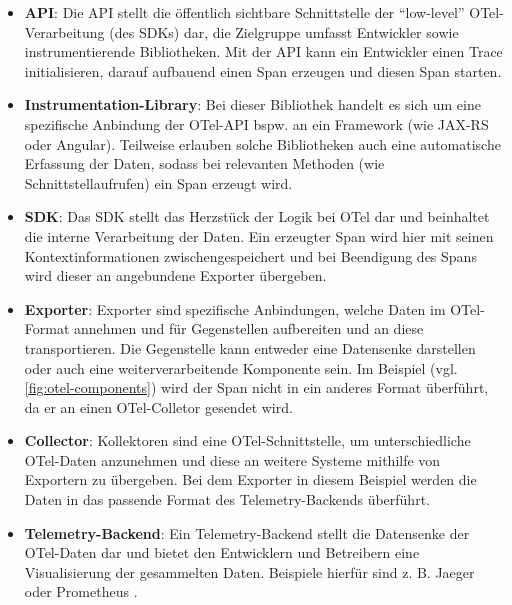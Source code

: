 \begin{itemize}
	\item \textbf{API}: Die API stellt die öffentlich sichtbare Schnittstelle der \enquote{low-level} OTel-Verarbeitung (des SDKs) dar, die Zielgruppe umfasst Entwickler sowie instrumentierende Bibliotheken. Mit der API kann ein Entwickler einen Trace initialisieren, darauf aufbauend einen Span erzeugen und diesen Span starten.
	
	\item \textbf{Instrumentation-Library}: Bei dieser Bibliothek handelt es sich um eine spezifische Anbindung der OTel-API bspw. an ein Framework (wie JAX-RS oder Angular). Teilweise erlauben solche Bibliotheken auch eine automatische Erfassung der Daten, sodass bei relevanten Methoden (wie Schnittstellaufrufen) ein Span erzeugt wird.
	
	\item \textbf{SDK}: Das SDK stellt das Herzstück der Logik bei OTel dar und beinhaltet die interne Verarbeitung der Daten. Ein erzeugter Span wird hier mit seinen Kontextinformationen zwischengespeichert und bei Beendigung des Spans wird dieser an angebundene Exporter übergeben.
	
	\item \textbf{Exporter}: Exporter sind spezifische Anbindungen, welche Daten im OTel-Format annehmen und für Gegenstellen aufbereiten und an diese transportieren. Die Gegenstelle kann entweder eine Datensenke darstellen oder auch eine weiterverarbeitende Komponente sein. Im Beispiel (vgl. \autoref{fig:otel-components}) wird der Span nicht in ein anderes Format überführt, da er an einen OTel-Colletor gesendet wird.
	
	\item \textbf{Collector}: Kollektoren sind eine OTel-Schnittstelle, um unterschiedliche OTel-Daten anzunehmen und diese an weitere Systeme mithilfe von Exportern zu übergeben. Bei dem Exporter in diesem Beispiel werden die Daten in das passende Format des Telemetry-Backends überführt.
	
	\item \textbf{Telemetry-Backend}: Ein Telemetry-Backend stellt die Datensenke der OTel-Daten dar und bietet den Entwicklern und Betreibern eine Visualisierung der gesammelten Daten. Beispiele hierfür sind z. B. Jaeger \cite{Jaeger} oder Prometheus \cite{Prometheus}.
\end{itemize}
 

